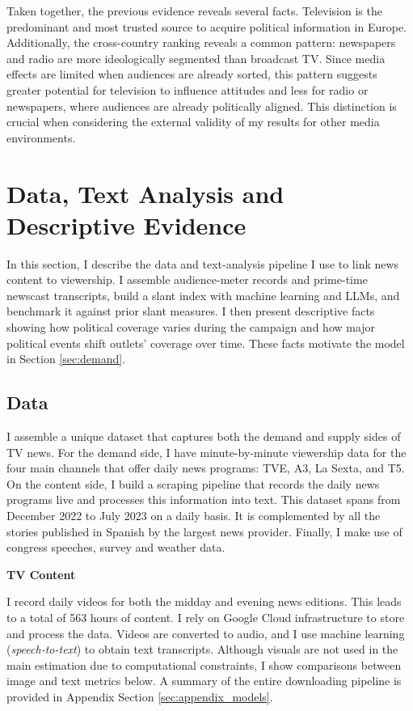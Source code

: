 \documentclass[12pt]{article}
\begin{document}
	Taken together, the previous evidence reveals several facts. Television is the predominant and most trusted source to acquire political information in Europe. Additionally, the cross-country ranking reveals a common pattern: newspapers and radio are more ideologically segmented than broadcast TV. Since media effects are limited when audiences are already sorted, this pattern suggests greater potential for television to influence attitudes and less for radio or newspapers, where audiences are already politically aligned. This distinction is crucial when considering the external validity of my results for other media environments.
	
	
	

	
	
	\section{Data, Text Analysis and Descriptive Evidence}
	\label{sec:data}
	
In this section, I describe the data and text-analysis pipeline I use to link news content to viewership. I assemble audience-meter records and prime-time newscast transcripts, build a slant index with machine learning and LLMs, and benchmark it against prior slant measures. I then present descriptive facts showing how political coverage varies during the campaign and how major political events shift outlets’ coverage over time. These facts motivate the model in Section \ref{sec:demand}.

	
		\subsection{Data}
		
		
		I assemble a unique dataset that captures both the demand and supply sides of TV news. For the demand side, I have minute-by-minute viewership data for the four main channels that offer daily news programs: TVE, A3, La Sexta, and T5. On the content side, I build a scraping pipeline that records the daily news programs live and processes this information into text. This dataset spans from December 2022 to July 2023 on a daily basis. It is complemented by all the stories published in Spanish by the largest news provider. Finally, I make use of congress speeches, survey and weather data.
		
		
			\textbf{TV Content}
		
		I record daily  videos for both the midday and evening news editions. This leads to a total of 563 hours of content. I rely on Google Cloud infrastructure to store and process the data. Videos are converted to audio, and I use machine learning (\textit{speech-to-text}) to obtain text transcripts. Although visuals are not used in the main estimation due to computational constraints, I show comparisons between image and text metrics below. A summary of the entire downloading pipeline is provided in Appendix Section \ref{sec:appendix_models}.
		
\end{document}
